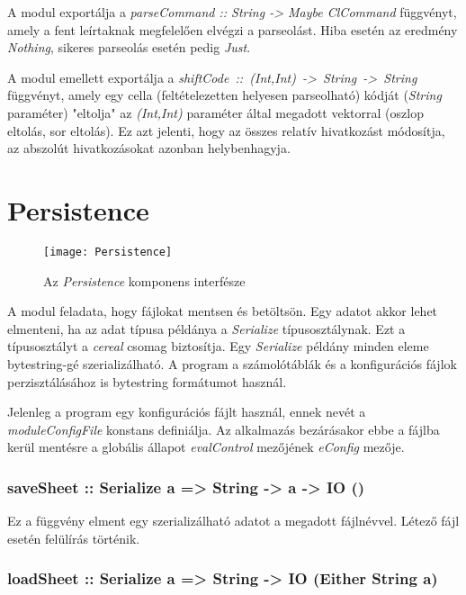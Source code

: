 A modul exportálja a \textit{parseCommand :: String -> Maybe ClCommand} függvényt, amely a fent leírtaknak megfelelően elvégzi a parseolást. Hiba esetén az eredmény \textit{Nothing}, sikeres parseolás esetén pedig \textit{Just}.

A modul emellett exportálja a \mbox{\textit{shiftCode :: (Int,Int) -> String -> String}} függvényt, amely egy cella (feltételezetten helyesen parseolható) kódját (\textit{String} paraméter) "eltolja" az \textit{(Int,Int)} paraméter által megadott vektorral (oszlop eltolás, sor eltolás). Ez azt jelenti, hogy az összes relatív hivatkozást módosítja, az abszolút hivatkozásokat azonban helybenhagyja.

\section{Persistence}

\begin{figure}[H]
	\centering
	\texttt{[image: Persistence]}
	\caption{Az \textit{Persistence} komponens interfésze}
	\label{fig:appstructure}
\end{figure}


A modul feladata, hogy fájlokat mentsen és betöltsön. Egy adatot akkor lehet elmenteni, ha az adat típusa példánya a \textit{Serialize} típusosztálynak. Ezt a típusosztályt a \textit{cereal} csomag biztosítja. Egy \textit{Serialize} példány minden eleme bytestring-gé szerializálható. A program a számolótáblák és a konfigurációs fájlok perzisztálásához is bytestring formátumot használ.

Jelenleg a program egy konfigurációs fájlt használ, ennek nevét a \textit{moduleConfigFile} konstans definiálja. Az alkalmazás bezárásakor ebbe a fájlba kerül mentésre a globális állapot \textit{evalControl} mezőjének \textit{eConfig} mezője.

\subsubsection{saveSheet :: Serialize a => String -> a -> IO ()}

Ez a függvény elment egy szerializálható adatot a megadott fájlnévvel. Létező fájl esetén felülírás történik. 

\subsubsection{loadSheet :: Serialize a => String -> IO (Either String a)}

